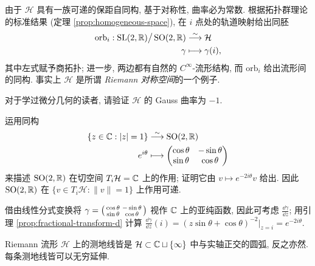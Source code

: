由于 $\mathcal{H}$ 具有一族可递的保距自同构, 基于对称性, 曲率必为常数. 根据拓扑群理论的标准结果 (定理 \ref{prop:homogeneous-space}), 在 $i$ 点处的轨道映射给出同胚
\begin{equation}\label{eqn:H-coset}\begin{aligned}
	\mathrm{orb}_i: \operatorname{SL}(2,\mathbb{R}) \big/ \operatorname{SO}(2,\mathbb{R}) & \stackrel{\sim}{\longrightarrow} \mathcal{H} \\
	\gamma & \longmapsto \gamma(i),
\end{aligned}\end{equation}
其中左式赋予商拓扑; 进一步, 两边都有自然的 $C^\infty$-流形结构, 而 $\mathrm{orb}_i$ 给出流形间的同构. 事实上 $\mathcal{H}$ 是所谓 \emph{Riemann 对称空间}的一个例子.

\begin{exercise}
	对于学过微分几何的读者, 请验证 $\mathcal{H}$ 的 Gauss 曲率为 $-1$.
\end{exercise}

\begin{exercise}
	运用同构
	\begin{align*}
		\{z \in \mathbb{C}: |z|=1 \} & \stackrel{\sim}{\longrightarrow} \operatorname{SO}(2,\mathbb{R}) \\
		e^{i\theta} & \longmapsto \begin{pmatrix} \cos\theta & -\sin\theta \\ \sin\theta & \cos\theta \end{pmatrix}
	\end{align*}
	来描述 $\operatorname{SO}(2,\mathbb{R})$ 在切空间 $T_i \mathcal{H} = \mathbb{C}$ 上的作用; 证明它由 $v \mapsto e^{-2i\theta}v$ 给出. 因此 $\operatorname{SO}(2,\mathbb{R})$ 在 $\{ v \in T_i \mathcal{H} : \|v\|=1 \}$ 上作用可递.

	\begin{hint}
		借由线性分式变换将 $\gamma = \bigl(\begin{smallmatrix} \cos\theta & -\sin\theta \\ \sin\theta & \cos\theta \end{smallmatrix}\bigr)$ 视作 $\mathbb{C}$ 上的亚纯函数, 因此可考虑 $\frac{\dd \gamma}{\dd z}$; 用引理 \ref{prop:fractional-transform-d} 计算 $\frac{\dd \gamma}{\dd z}(i) = (z \sin\theta + \cos\theta)^{-2} \big|_{z=i} = e^{-2i\theta}$.
	\end{hint}
\end{exercise}

\begin{proposition}\label{prop:geodesics} 
	Riemann 流形 $\mathcal{H}$ 上的测地线皆是 $\mathcal{H} \subset \mathbb{C} \sqcup \{\infty \}$ 中与实轴正交的圆弧, 反之亦然. 每条测地线皆可以无穷延伸.
\end{proposition}

